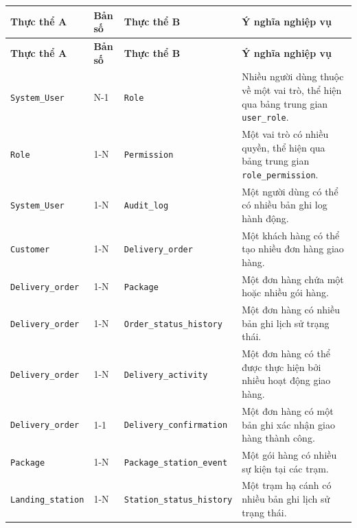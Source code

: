 \renewcommand{\arraystretch}{1.2}
\begin{longtable}{|p{3.4cm}|p{1cm}|p{5.3cm}|p{6cm}|}
\hline
\textbf{Thực thể A} &
\textbf{Bản số} &
\textbf{Thực thể B} &
\textbf{Ý nghĩa nghiệp vụ} \\ \hline
\endfirsthead

\hline
\textbf{Thực thể A} &
\textbf{Bản số} &
\textbf{Thực thể B} &
\textbf{Ý nghĩa nghiệp vụ} \\ \hline
\endhead

\texttt{System\_User} &
N-1 & 
\texttt{Role} & Nhiều người dùng thuộc về một vai trò, thể hiện qua bảng trung gian \texttt{user\_role}. \\ \hline

\texttt{Role} & 
1-N & 
\texttt{Permission} & Một vai trò có nhiều quyền, thể hiện qua bảng trung gian \texttt{role\_permission}. \\ \hline

\texttt{System\_User} &
1-N & 
\texttt{Audit\_log} & Một người dùng có thể có nhiều bản ghi log hành động. \\ \hline

\texttt{Customer} & 
1-N & \texttt{Delivery\_order} & Một khách hàng có thể tạo nhiều đơn hàng giao hàng. \\ \hline

\texttt{Delivery\_order} & 
1-N & 
\texttt{Package} & Một đơn hàng chứa một hoặc nhiều gói hàng. \\ \hline

\texttt{Delivery\_order} & 
1-N & 
\texttt{Order\_status\_history} & Một đơn hàng có nhiều bản ghi lịch sử trạng thái. \\ \hline

\texttt{Delivery\_order} & 
1-N & 
\texttt{Delivery\_activity} & Một đơn hàng có thể được thực hiện bởi nhiều hoạt động giao hàng. \\ \hline

\texttt{Delivery\_order} & 
1-1 & 
\texttt{Delivery\_confirmation} & Một đơn hàng có một bản ghi xác nhận giao hàng thành công. \\ \hline

\texttt{Package} & 
1-N & 
\texttt{Package\_station\_event} & Một gói hàng có nhiều sự kiện tại các trạm. \\ \hline

\texttt{Landing\_station} & 
1-N & 
\texttt{Station\_status\_history} & Một trạm hạ cánh có nhiều bản ghi lịch sử trạng thái. \\ \hline


\end{longtable}
